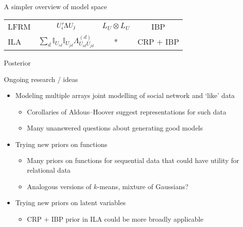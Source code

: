 \begin{frame}{A simpler overview of model space}
\begin{block}{}
\begin{tabular}{l|ccc}
    LFRM & $U_i'\Lambda U_j$ & $L_U \otimes L_U$ & IBP \\%
    ILA & $\sum_d \mathbb{I}_{U_{id}}\mathbb{I}_{U_{jd}}\Lambda^{(d)}_{U_{id}U_{jd}}$ & * & CRP $+$ IBP \\%
\end{tabular}
  \end{block}
\end{frame}

\begin{frame}{Posterior}
  \begin{block}{}
  \begin{center}
  
\end{center}
  \end{block}
\end{frame}

\begin{frame}{Ongoing research / ideas}
  \begin{block}{}
    \begin{itemize}
      \item Modeling multiple arrays \eg joint modelling of social network and `like' data
      \begin{itemize}
        \item Corollaries of Aldous--Hoover suggest representations for such data
        \item Many unanswered questions about generating good models
      \end{itemize}
      \vspace{\baselineskip}
      \item Trying new priors on functions
      \begin{itemize}
        \item Many priors on functions for sequential data that could have utility for relational data
        \item \eg Analogous versions of $k$-means, mixture of Gaussians?
      \end{itemize}
      \vspace{\baselineskip}
      \item Trying new priors on latent variables
      \begin{itemize}
        \item CRP $+$ IBP prior in ILA could be more broadly applicable
      \end{itemize}
    \end{itemize}
  \end{block}
\end{frame}

